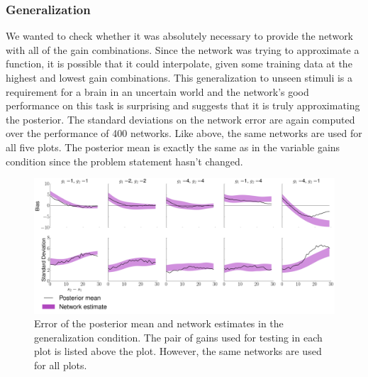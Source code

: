 \documentclass{article} %
\begin{document}
\subsubsection{Generalization}
We wanted to check whether it was absolutely necessary to provide the network with all of the gain combinations. Since the network was trying to approximate a function, it is possible that it could interpolate, given some training data at the highest and lowest gain combinations. This generalization to unseen stimuli is a requirement for a brain in an uncertain world and the network's good performance on this task is surprising and suggests that it is truly approximating the posterior. The standard deviations on the network error are again computed over the performance of 400 networks. Like above, the same networks are used for all five plots. The posterior mean is exactly the same as in the variable gains condition since the problem statement hasn't changed.
\begin{figure}[h]
\centering
\includegraphics[width = \textwidth]{High-Low_Gains.png}
\caption{Error of the posterior mean and network estimates in the generalization condition. The pair of gains used for testing in each plot is listed above the plot. However, the same networks are used for all plots.}
\end{figure}
\\
\end{document}
